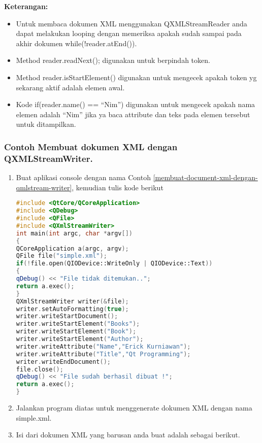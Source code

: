 \textbf{Keterangan:}

\begin{itemize}

\item
  Untuk membaca dokumen XML menggunakan QXMLStreamReader anda dapat
  melakukan looping dengan memeriksa apakah sudah sampai pada akhir
  dokumen while(!reader.atEnd()).
\item
  Method reader.readNext(); digunakan untuk berpindah token.
\item
  Method reader.isStartElement() digunakan untuk mengecek apakah token
  yg sekarang aktif adalah elemen awal.
\item
  Kode if(reader.name() == ``Nim'') digunakan untuk mengecek apakah nama
  elemen adalah ``Nim'' jika ya baca attribute dan teks pada elemen
  tersebut untuk ditampilkan.
\end{itemize}

\subsubsection*{Contoh  Membuat dokumen XML dengan QXMLStreamWriter.}

\begin{enumerate}

\item
  Buat aplikasi console dengan nama Contoh \ref{membuat-document-xml-dengan-qmlstream-writer}, kemudian tulis kode
  berikut

\begin{lstlisting}[language=c++, caption=Membuat dokumen XML dengan QXMLStreamWriter, label=membuat-document-xml-dengan-qmlstream-writer]
#include <QtCore/QCoreApplication>
#include <QDebug>
#include <QFile>
#include <QXmlStreamWriter>
int main(int argc, char *argv[])
{
QCoreApplication a(argc, argv);
QFile file("simple.xml");
if(!file.open(QIODevice::WriteOnly | QIODevice::Text))
{
qDebug() << "File tidak ditemukan..";
return a.exec();
}
QXmlStreamWriter writer(&file);
writer.setAutoFormatting(true);
writer.writeStartDocument();
writer.writeStartElement("Books");
writer.writeStartElement("Book");
writer.writeStartElement("Author");
writer.writeAttribute("Name","Erick Kurniawan");
writer.writeAttribute("Title","Qt Programming");
writer.writeEndDocument();
file.close();
qDebug() << "File sudah berhasil dibuat !";
return a.exec();
}
\end{lstlisting}
\item
  Jalankan program diatas untuk menggenerate dokumen XML dengan nama
  simple.xml.
\item
  Isi dari dokumen XML yang barusan anda buat adalah sebagai berikut.
\end{enumerate}



